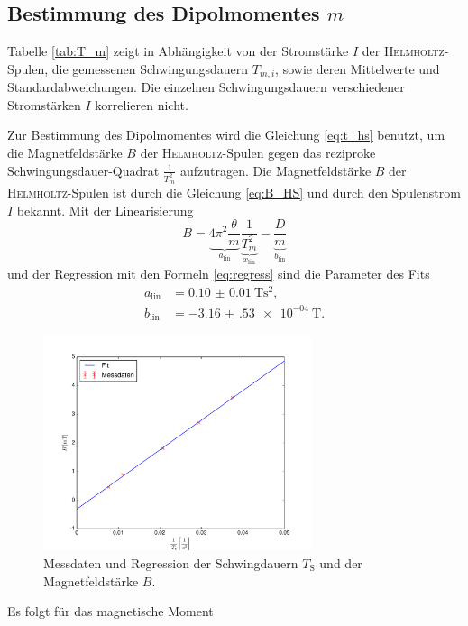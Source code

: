\subsection{Bestimmung des Dipolmomentes \texorpdfstring{$m$}{m}}
\label{sec:auswertung2}
Tabelle \ref{tab:T_m} zeigt in Abhängigkeit von der Stromstärke $I$ der \textsc{Helmholtz}-Spulen, die gemessenen Schwingungsdauern $T_{m,i}$, sowie deren Mittelwerte und Standardabweichungen. 
Die einzelnen Schwingungsdauern verschiedener Stromstärken $I$ korrelieren nicht.

Zur Bestimmung des Dipolmomentes wird die Gleichung \eqref{eq:t_hs} benutzt, um die Magnetfeldstärke $B$ 
der \textsc{Helmholtz}-Spulen gegen das reziproke Schwingungsdauer-Quadrat $\frac{1}{T_{m}^2}$ aufzutragen.
Die Magnetfeldstärke $B$ der \textsc{Helmholtz}-Spulen ist durch die Gleichung \eqref{eq:B_HS} und durch den Spulenstrom $I$ bekannt.
Mit der Linearisierung
\begin{equation}
	B = \underbrace{4\pi^2\frac{\theta}{m}}_{a_\text{lin}} \underbrace{\frac{1}{T_m^2}}_{x_\text{lin}} - \underbrace{\frac{D}{m}}_{b_\text{lin}}
	\label{eq:B_lin}
\end{equation}
und der Regression mit den Formeln \eqref{eq:regress}
sind die Parameter des Fits
\begin{align}
	a_\text{lin}&=	\SI{0.10(1)}{\tesla\second\squared}, \\%
	b_\text{lin}&=	-\SI{3.16(53)e-04}{\tesla}.
\end{align}
\begin{figure}[p]
	\centering
	\includegraphics[width=0.7\textwidth]{Bilder/Magnetfeld.pdf}
	\caption{Messdaten und Regression der Schwingdauern $T_\text{S}$ und der Magnetfeldstärke $B$.}
	\label{fig:Magnetfeld}
\end{figure}
Es folgt für das magnetische Moment
